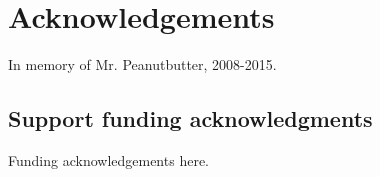 

\begingroup
\let\clearpage\relax
\let\cleardoublepage\relax
\let\cleardoublepage\relax

\clearpage
\chapter*{Acknowledgements}

In memory of Mr. Peanutbutter, 2008-2015.

\section*{Support funding acknowledgments} %
\label{sec:support_funding_acknowledgments}

Funding acknowledgements here.


\endgroup



